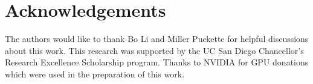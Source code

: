 \documentclass[a4paper]{article}
\begin{document}
\section{Acknowledgements}

The authors would like to thank Bo Li and Miller Puckette for helpful discussions about this work. 
This research was supported by the UC San Diego Chancellor’s Research Excellence Scholarship program.
Thanks to NVIDIA for GPU donations which were used in the preparation of this work.






\end{document}
